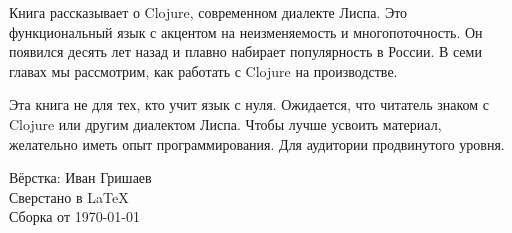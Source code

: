 \thispagestyle{empty}

\small

Книга рассказывает о Clojure, современном диалекте Лиспа. Это функциональный
язык с акцентом на неизменяемость и многопоточность. Он появился десять лет
назад и плавно набирает популярность в России. В семи главах мы рассмотрим, как
работать с Clojure на производстве.

Эта книга не для тех, кто учит язык с нуля. Ожидается, что читатель знаком с
Clojure или другим диалектом Лиспа. Чтобы лучше усвоить материал, желательно
иметь опыт программирования. Для аудитории продвинутого уровня.

\normalfont

\vspace{5em}

\noindent
Вёрстка: Иван Гришаев\\
Сверстано в \LaTeX\\
Сборка от \today
